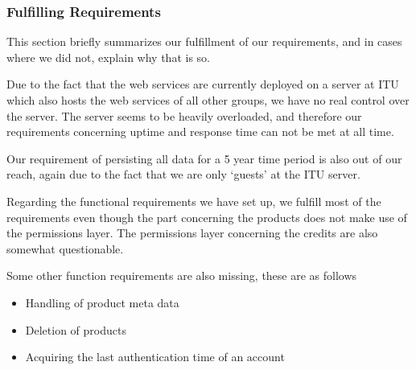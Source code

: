 \subsubsection{Fulfilling Requirements}
\label{serverfulfil}
This section briefly summarizes our fulfillment of our requirements, and in cases where we did not, explain why that is so.

Due to the fact that the web services are currently deployed on a server at ITU which also hosts the web services of all other groups, we have no real control over the server. The server seems to be heavily overloaded, and therefore our requirements concerning uptime and response time can not be met at all time.

Our requirement of persisting all data for a 5 year time period is also out of our reach, again due to the fact that we are only `guests' at the ITU server.

Regarding the functional requirements we have set up, we fulfill most of the requirements even though the part concerning the products does not make use of the permissions layer. The permissions layer concerning the credits are also somewhat questionable. 

Some other function requirements are also missing, these are as follows
\begin{itemize}
\item Handling of product meta data
\item Deletion of products
\item Acquiring the last authentication time of an account
\end{itemize}

